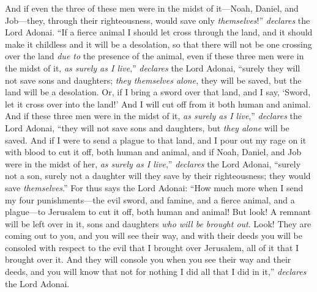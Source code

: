 \begin{biblechapter}
\verse And if even the three of these men were in the midst of it—Noah, Daniel, and Job—they, through their righteousness, would save only \textit{themselves}!” \textit{declares} the Lord Adonai.
\verse “If a fierce animal I should let cross through the land, and it should make it childless and it will be a desolation, so that there will not be one crossing over the land \textit{due to} the presence of the animal,
\verse even if these three men were in the midst of it, \textit{as surely as I live},” \textit{declares} the Lord Adonai, “surely they will not save sons and daughters; \textit{they themselves alone}, they will be saved, but the land will be a desolation.
\verse Or, if I bring a sword over that land, and I say, ‘Sword, let it cross over into the land!’ And I will cut off from it both human and animal.
\verse And if these three men were in the midst of it, \textit{as surely as I live},” \textit{declares} the Lord Adonai, “they will not save sons and daughters, but \textit{they alone} will be saved.
\verse And if I were to send a plague to that land, and I pour out my rage on it with blood to cut it off, both human and animal,
\verse and if Noah, Daniel, and Job were in the midst of her, \textit{as surely as I live},” \textit{declares} the Lord Adonai, “surely not a son, surely not a daughter will they save by their righteousness; they would save \textit{themselves}.”
\verse For thus says the Lord Adonai: “How much more when I send my four punishments—the evil sword, and famine, and a fierce animal, and a plague—to Jerusalem to cut it off, both human and animal!
\verse But look! A remnant will be left over in it, sons and daughters \textit{who will be brought out}. Look! They are coming out to you, and you will see their way, and with their deeds you will be consoled with respect to the evil that I brought over Jerusalem, all of it that I brought over it.
\verse And they will console you when you see their way and their deeds, and you will know that not for nothing I did all that I did in it,” \textit{declares} the Lord Adonai.
\end{biblechapter}

